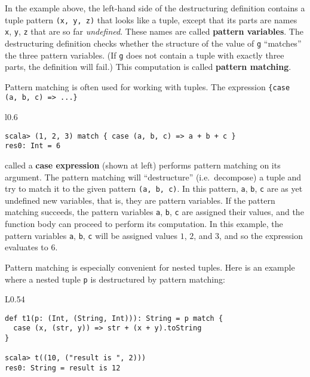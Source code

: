 In the example above, the left-hand side of the destructuring definition
contains a tuple pattern \lstinline!(x, y, z)! that looks like a
tuple, except that its parts are names \lstinline!x!, \lstinline!y!,
\lstinline!z! that are so far \emph{undefined}. These names are called
\textbf{pattern variables}. The destructuring
definition checks whether the structure of the value of \lstinline!g!
``matches'' the three pattern variables.
(If \lstinline!g! does not contain a tuple with exactly three parts,
the definition will fail.) This computation is called \textbf{pattern
matching}.

Pattern matching is often used for working with tuples. The expression
\lstinline!{case (a, b, c) => ...}!\begin{wrapfigure}{l}{0.6\columnwidth}%
\vspace{-0.7\baselineskip}
\begin{lstlisting}
scala> (1, 2, 3) match { case (a, b, c) => a + b + c }
res0: Int = 6
\end{lstlisting}
\vspace{-1.5\baselineskip}
\end{wrapfigure}%
called a \textbf{case expression} (shown at
left) performs pattern matching on its argument. The pattern matching
will ``destructure'' (i.e.~decompose) a tuple and try to match
it to the given pattern \lstinline!(a, b, c)!. In this pattern, \lstinline!a!,
\lstinline!b!, \lstinline!c! are as yet undefined new variables,
\textendash{} that is, they are pattern
variables. If the pattern matching succeeds, the pattern variables
\lstinline!a!, \lstinline!b!, \lstinline!c! are assigned their
values, and the function body can proceed to perform its computation.
In this example, the pattern variables \lstinline!a!, \lstinline!b!,
\lstinline!c! will be assigned values $1$, $2$, and $3$, and so
the expression evaluates to $6$.

Pattern matching is especially convenient for nested tuples. Here
is an example where a nested tuple \lstinline!p! is destructured
by pattern matching:\hfill{}~\begin{wrapfigure}{L}{0.54\columnwidth}%
\vspace{-0.8\baselineskip}
\begin{lstlisting}
def t1(p: (Int, (String, Int))): String = p match {
  case (x, (str, y)) => str + (x + y).toString
}

scala> t((10, ("result is ", 2)))
res0: String = result is 12
\end{lstlisting}
\vspace{-1.5\baselineskip}
\end{wrapfigure}%
\textbf{ }

